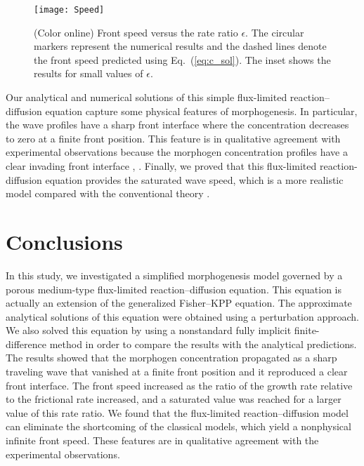 \documentclass[jkps,preprint,fleqn,showpacs,showkeys]{revtex4}
\newcommand{\eq}[1]{Eq.~(\ref{#1})}
\begin{document}
\begin{figure}[h]
\centering\texttt{[image: Speed]}
\caption{\label{fig:front_speed}
(Color online) Front speed versus the rate ratio $\epsilon$. The circular markers represent the numerical results and the dashed lines denote the front speed predicted using \eq{eq:c_sol}. The inset shows the results for small values of $\epsilon$.
}
\end{figure}

Our analytical and numerical solutions of this simple flux-limited reaction--diffusion equation capture some physical features of morphogenesis. In particular, the wave profiles have a sharp front interface where the concentration decreases to zero at a finite front position. This feature is in qualitative agreement with experimental observations because the morphogen concentration profiles have a clear invading front interface \cite{Verbeni2013morphogenetic}, \cite{Sanchez2015modeling}. Finally, we proved that this flux-limited reaction-diffusion equation provides the saturated wave speed, which is a more realistic model compared with the conventional theory \cite{Rosenau1992Tempered}. 

\section{Conclusions \label{sec:Conclusions}}
In this study, we investigated a simplified morphogenesis model governed by a porous medium-type flux-limited reaction--diffusion equation. This equation is actually an extension of the generalized Fisher--KPP equation. The approximate analytical solutions of this equation were obtained using a perturbation approach. We also solved this equation by using a nonstandard fully implicit finite-difference method in order to compare the results with the analytical predictions. The results showed that the morphogen concentration propagated as a sharp traveling wave that vanished at a finite front position and it reproduced a clear front interface. The front speed increased as the ratio of the growth rate relative to the frictional rate increased, and a saturated value was reached for a larger value of this rate ratio. We found that the flux-limited reaction--diffusion model can eliminate the shortcoming of the classical models, which yield a nonphysical infinite front speed. These features are in qualitative agreement with the experimental observations.
\end{document}
